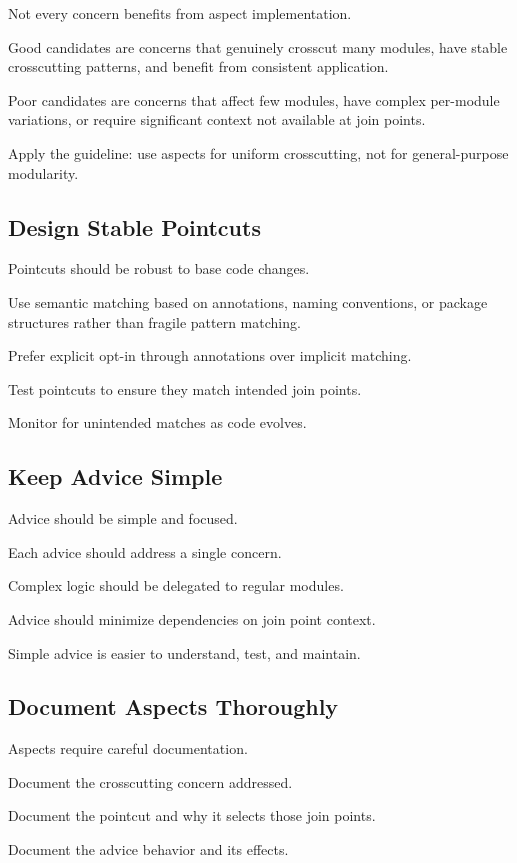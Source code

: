 \documentclass[11pt]{article}
\begin{document}
Not every concern benefits from aspect implementation.

Good candidates are concerns that genuinely crosscut many modules, have stable crosscutting patterns, and benefit from consistent application.

Poor candidates are concerns that affect few modules, have complex per-module variations, or require significant context not available at join points.

Apply the guideline: use aspects for uniform crosscutting, not for general-purpose modularity.

\subsection{Design Stable Pointcuts}

Pointcuts should be robust to base code changes.

Use semantic matching based on annotations, naming conventions, or package structures rather than fragile pattern matching.

Prefer explicit opt-in through annotations over implicit matching.

Test pointcuts to ensure they match intended join points.

Monitor for unintended matches as code evolves.

\subsection{Keep Advice Simple}

Advice should be simple and focused.

Each advice should address a single concern.

Complex logic should be delegated to regular modules.

Advice should minimize dependencies on join point context.

Simple advice is easier to understand, test, and maintain.

\subsection{Document Aspects Thoroughly}

Aspects require careful documentation.

Document the crosscutting concern addressed.

Document the pointcut and why it selects those join points.

Document the advice behavior and its effects.
\end{document}

